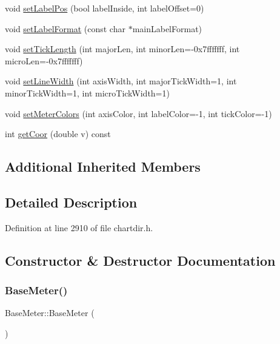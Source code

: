 \begin{DoxyCompactItemize}
\item 
void \hyperlink{class_base_meter_ace5fe7e4565e651924666b02ae69da65}{set\+Label\+Pos} (bool label\+Inside, int label\+Offset=0)
\item 
void \hyperlink{class_base_meter_a1e93a1c74681f4fd32b93e068913efb7}{set\+Label\+Format} (const char $\ast$main\+Label\+Format)
\item 
void \hyperlink{class_base_meter_afc722de87aa05068cf28bce77c5a0d96}{set\+Tick\+Length} (int major\+Len, int minor\+Len=-\/0x7fffffff, int micro\+Len=-\/0x7fffffff)
\item 
void \hyperlink{class_base_meter_a356cadb2071ff42164974e5809840f5f}{set\+Line\+Width} (int axis\+Width, int major\+Tick\+Width=1, int minor\+Tick\+Width=1, int micro\+Tick\+Width=1)
\item 
void \hyperlink{class_base_meter_ab84e7d42596803b75cd15bd721ae96f1}{set\+Meter\+Colors} (int axis\+Color, int label\+Color=-\/1, int tick\+Color=-\/1)
\item 
int \hyperlink{class_base_meter_af6703e71691837360f4f3d408730c7d7}{get\+Coor} (double v) const
\end{DoxyCompactItemize}
\subsection*{Additional Inherited Members}


\subsection{Detailed Description}


Definition at line 2910 of file chartdir.\+h.



\subsection{Constructor \& Destructor Documentation}
\mbox{\label{class_base_meter_a2e8ea1110428a27c5e10cb859a573c9e}} 
\subsubsection{\texorpdfstring{Base\+Meter()}{BaseMeter()}}
{\footnotesize\ttfamily Base\+Meter\+::\+Base\+Meter (\begin{DoxyParamCaption}{ }\end{DoxyParamCaption})\hspace{0.3cm}{\ttfamily [inline]}}



